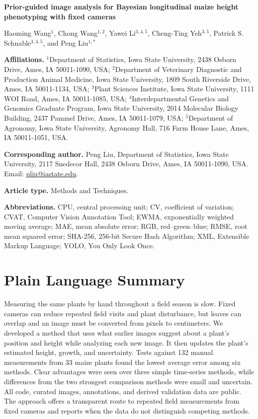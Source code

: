 \documentclass[12pt,letterpaper]{article}
\newcommand{\manuscripttitle}{Prior-guided image analysis for Bayesian longitudinal maize height phenotyping with fixed cameras}
\begin{document}
\linenumbers

{
\singlespacing
\begin{center}
{\large\bfseries \manuscripttitle\par}
\vspace{1em}
Haoming Wang$^{1}$, Chong Wang$^{1,2}$, Yawei Li$^{3,4,5}$, Cheng-Ting Yeh$^{3,5}$, Patrick S. Schnable$^{3,4,5}$, and Peng Liu$^{1,*}$
\end{center}

\noindent\textbf{Affiliations.} $^{1}$Department of Statistics, Iowa State University, 2438 Osborn Drive, Ames, IA 50011-1090, USA; $^{2}$Department of Veterinary Diagnostic and Production Animal Medicine, Iowa State University, 1809 South Riverside Drive, Ames, IA 50011-1134, USA; $^{3}$Plant Sciences Institute, Iowa State University, 1111 WOI Road, Ames, IA 50011-1085, USA; $^{4}$Interdepartmental Genetics and Genomics Graduate Program, Iowa State University, 2014 Molecular Biology Building, 2437 Pammel Drive, Ames, IA 50011-1079, USA; $^{5}$Department of Agronomy, Iowa State University, Agronomy Hall, 716 Farm House Lane, Ames, IA 50011-1051, USA.

\noindent\textbf{Corresponding author.} Peng Liu, Department of Statistics, Iowa State University, 2117 Snedecor Hall, 2438 Osborn Drive, Ames, IA 50011-1090, USA. Email: \href{mailto:pliu@iastate.edu}{pliu@iastate.edu}.

\noindent\textbf{Article type.} Methods and Techniques.

\noindent\textbf{Abbreviations.} CPU, central processing unit; CV, coefficient of variation; CVAT, Computer Vision Annotation Tool; EWMA, exponentially weighted moving average; MAE, mean absolute error; RGB, red--green--blue; RMSE, root mean squared error; SHA-256, 256-bit Secure Hash Algorithm; XML, Extensible Markup Language; YOLO, You Only Look Once.
}

\clearpage

\section*{Plain Language Summary}
Measuring the same plants by hand throughout a field season is slow. Fixed cameras can reduce repeated field visits and plant disturbance, but leaves can overlap and an image must be converted from pixels to centimeters. We developed a method that uses what earlier images suggest about a plant's position and height while analyzing each new image. It then updates the plant's estimated height, growth, and uncertainty. Tests against 132 manual measurements from 33 maize plants found the lowest average error among six methods. Clear advantages were seen over three simple time-series methods, while differences from the two strongest comparison methods were small and uncertain. All code, curated images, annotations, and derived validation data are public. The approach offers a transparent route to repeated field measurements from fixed cameras and reports when the data do not distinguish competing methods.
\end{document}
